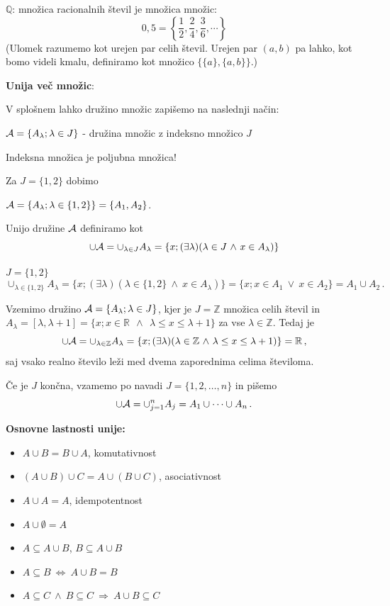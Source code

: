 \documentclass[11pt,paper=b5,DIV=13,headinclude,footinclude]{scrbook}
\newcounter{example}
\def\ali {{~\vee~}}
\def\inn {{~\wedge~}}
\def\sledi {{~\Rightarrow~}}
\def\cee {{~\Leftrightarrow~}}
\begin{document}
\begin{example*}
$\mathbb{Q}$: množica racionalnih števil je množica množic:
$$0,5 = \left\{\frac{1}{2}, \frac{2}{4}, \frac{3}{6}, \cdots\right\}$$
(Ulomek razumemo kot urejen par celih števil. Urejen par $(a,b)$ pa lahko, kot bomo videli kmalu, definiramo kot množico $\{\{a\},\{a,b\}\}$.)\end{example*}

\medskip

\textbf{ Unija več množic}:

V splošnem lahko družino množic zapišemo na naslednji način:

${\cal A} = \{A_\lambda; \lambda \in J\}$ - družina množic z indeksno množico $J$

Indeksna množica je poljubna množica!

\medskip
\begin{example*}
Za $J = \{1,2\}$ dobimo

${\cal A} = \{A_\lambda; \lambda \in \{1,2\}\} = \{A_1,A_2\}$.\end{example*}

\medskip
Unijo družine ${\cal A}$ definiramo kot
$$\cup {\cal A} = \cup_{\lambda \in J} A_\lambda = \{x;(\exists \lambda) (\lambda \in J\inn x\in A_\lambda)\}$$

\medskip
\begin{example*} $J = \{1,2\}$
$$\cup_{\lambda \in \{1,2\}} A_\lambda = \{x;(\exists \lambda) (\lambda \in \{1,2\}\inn x\in A_\lambda)\}= \{x;x\in A_1 \ali x\in A_2\} = A_1\cup A_2\,.$$
\end{example*}

\medskip
\begin{example*}
Vzemimo družino
${\cal A} = \{A_\lambda; \lambda \in J\}$, kjer je $J = \mathbb{Z}$ množica celih števil
in $A_\lambda = [\lambda,\lambda+1] = \{x; x\in \mathbb{R}~\inn~\lambda\le x\le \lambda +1\}$ za vse $\lambda\in \mathbb{Z}$.
Tedaj je
$$\cup {\cal A} = \cup_{\lambda\in \mathbb{Z}}A_\lambda
= \{x;(\exists \lambda) (\lambda \in \mathbb{Z}\inn \lambda \le x\le \lambda +1)\} = \mathbb{R}\,,$$
saj vsako realno število leži med dvema zaporednima celima številoma.\end{example*}

\medskip
Če je $J$ končna, vzamemo po navadi $J = \{1,2,\ldots, n\}$ in pišemo
$$\cup {\cal A} = \cup_{j = 1}^nA_j = A_1\cup\cdots\cup A_n\,.$$


\bigskip
\textbf{ Osnovne lastnosti unije:}
\begin{itemize}
  \item $A\cup B = B\cup A$, komutativnost
  \item $(A\cup B)\cup C = A\cup (B\cup C)$, asociativnost
  \item $A\cup A = A$, idempotentnost
  \item $A\cup \emptyset = A$
  \item $A\subseteq A\cup B$, $B\subseteq A\cup B$
  \item $A\subseteq B\cee A\cup B = B$
  \item $A\subseteq C\inn B\subseteq C\sledi A\cup B \subseteq C$
\end{itemize}
\end{document}
